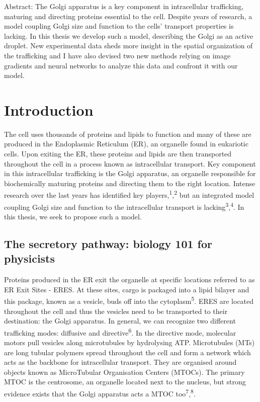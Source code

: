\documentclass{Dissertate}
\begin{document}
Abstract: The Golgi apparatus is a key component in intracellular
trafficking, maturing and directing proteins essential to the cell.
Despite years of research, a model coupling Golgi size and function to
the cells' transport properties is lacking. In this thesis we develop
such a model, describing the Golgi as an active droplet. New
experimental data sheds more insight in the spatial organization of the
trafficking and I have also devised two new methods relying on image
gradients and neural networks to analyze this data and confront it with
our model.

\setcounter{page}{1}
\newpage
{}

\tableofcontents

\newpage

\hypertarget{introduction}{%
\chapter{Introduction}\label{introduction}}

The cell uses thousands of proteins and lipids to function and many of
these are produced in the Endoplasmic Reticulum (ER), an organelle found
in eukariotic cells. Upon exiting the ER, these proteins and lipids are
then transported throughout the cell in a process known as intracellular
transport. Key component in this intracellular trafficking is the Golgi
apparatus, an organelle responsible for biochemically maturing proteins
and directing them to the right location. Intense research over the last
years has identified key players,\textsuperscript{1},\textsuperscript{2}
but an integrated model coupling Golgi size and function to the
intracellular transport is
lacking\textsuperscript{3},\textsuperscript{4}. In this thesis, we seek
to propose such a model.

\hypertarget{the-secretory-pathway-biology-101-for-physicists}{%
\section{The secretory pathway: biology 101 for
physicists}\label{the-secretory-pathway-biology-101-for-physicists}}

Proteins produced in the ER exit the organelle at specific locations
referred to as ER Exit Sites - ERES. At these sites, cargo is packaged
into a lipid bilayer and this package, known as a vesicle, buds off into
the cytoplasm\textsuperscript{5}. ERES are located throughout the cell
and thus the vesicles need to be transported to their destination: the
Golgi apparatus. In general, we can recognize two different trafficking
modes: diffusive and directive\textsuperscript{6}. In the directive
mode, molecular motors pull vesicles along microtubules by hydrolysing
ATP. Microtubules (MTs) are long tubular polymers spread throughout the
cell and form a network which acts as the backbone for intracellular
transport. They are organised around objects known as MicroTubular
Organisation Centers (MTOCs). The primary MTOC is the centrosome, an
organelle located next to the nucleus, but strong evidence exists that
the Golgi apparatus acts a MTOC
too\textsuperscript{7},\textsuperscript{8}.
\end{document}

